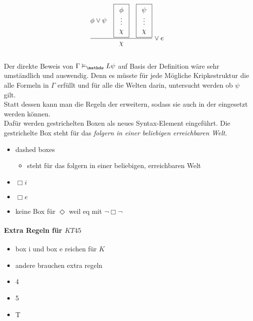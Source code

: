 \begin{equation}
	\label{eq:eDisjunction}
	\frac{
		\phi \vee \psi 
		\quad \boxed{ \begin{array}{c} \phi\\ \vdots\\ \chi \end{array} } 
		\quad \boxed{ \begin{array}{c} \psi\\ \vdots\\ \chi \end{array} }
	}
	{\chi}
	\vee e
\end{equation}

\subsection{\ND \ML} %
\label{par:natuerliche_deduktion_ml}
Der direkte Beweis von $\Gamma \vDash_\Menge{L} \psi$ auf Basis der Definition wäre sehr umständlich und auswendig.
Denn es müsste für jede Mögliche Kripkestruktur die alle Formeln in $\Gamma$ erfüllt und für alle die Welten darin, untersucht werden ob $\psi$ gilt.\\
Statt dessen kann man die Regeln der \ND erweitern, sodass sie auch in der \ML eingesetzt werden können.\\
Dafür werden gestrichelten Boxen als neues Syntax-Element eingeführt.
Die gestrichelte Box steht für das \emph{folgern in einer beliebigen erreichbaren Welt}.


\begin{itemize}
	\item dashed boxes
	\begin{itemize}
		\item steht für das folgern in einer beliebigen, erreichbaren Welt
	\end{itemize}
	\item $\Box i$
	\item $\Box e$
	\item keine Box für $\Diamond$ weil eq mit $\neg \Box \neg$
\end{itemize}

\paragraph{Extra Regeln für $KT45$} %
\label{par:extra_regeln_für_kt45_}
\begin{itemize}
	\item box i und box e reichen für $K$
	\item andere brauchen extra regeln
	\item 4
	\item 5
	\item T
\end{itemize}


